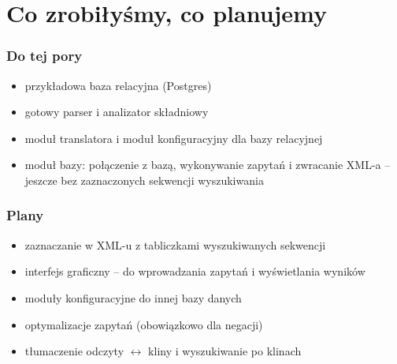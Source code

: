 \documentclass[xcolor=dvipsnames,10pt]{beamer}
\begin{document}
\section{Co zrobiłyśmy, co planujemy}


\begin{frame}
     \frametitle{Do tej pory}
     
\begin{itemize}
\item przykładowa baza relacyjna (Postgres)
\item gotowy parser i analizator składniowy
\item moduł translatora i moduł konfiguracyjny dla bazy relacyjnej
\item moduł bazy: połączenie z bazą, wykonywanie zapytań i zwracanie XML-a -- jeszcze bez zaznaczonych sekwencji wyszukiwania
\end{itemize}


\end{frame}

\begin{frame}
     \frametitle{Plany}
     
\begin{itemize}
\item zaznaczanie w XML-u z tabliczkami wyszukiwanych sekwencji
\item interfejs graficzny -- do wprowadzania zapytań i wyświetlania wyników
\item moduły konfiguracyjne do innej bazy danych
\item optymalizacje zapytań (obowiązkowo dla negacji)
\item tłumaczenie odczyty $\leftrightarrow$  kliny i wyszukiwanie po klinach
\end{itemize}
\end{frame}


\end{document}
